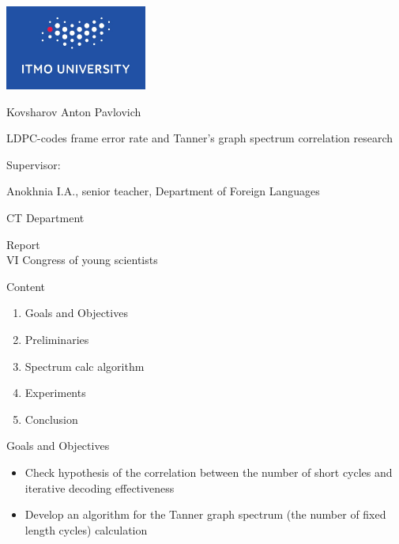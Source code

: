 \documentclass[t,13pt,graphics=pdflatex,xcolor=table,aspectratio=43]{beamer}
\begin{document}
\begingroup
{}
\begin{frame}[plain]
\color{white}
\centering\bfseries
\includegraphics[width=0.35\textwidth]{itmo_small_blue_eng.jpg}

{\Large Kovsharov Anton Pavlovich \par}

\vspace{0pt plus 0.3filll}

{\large LDPC-codes frame error rate and Tanner's graph spectrum correlation research}

\vspace{0pt plus 0.3filll}

{\small Supervisor:\par
 Anokhnia I.A., senior teacher, Department of Foreign Languages}

\vspace{0pt plus 0.3filll}

{\small CT Department \hfill } 

\vspace{0pt plus 1filll}
\end{frame}
\endgroup

\begin{frame}{Report \\ VI Congress of young scientists}
\begin{block}{Content}
\begin{enumerate}
    \item Goals and Objectives
    \item Preliminaries
    \item Spectrum calc algorithm
    \item Experiments
    \item Conclusion
\end{enumerate}
\end{block}
\end{frame}

\begin{frame}{Goals and Objectives}
\begin{itemize}
  \item Check hypothesis of the correlation between the number of 
    short cycles and iterative decoding effectiveness
  \item Develop an algorithm for the Tanner graph spectrum (the number of fixed length cycles) calculation
\end{itemize}
\end{frame}
\end{document}
